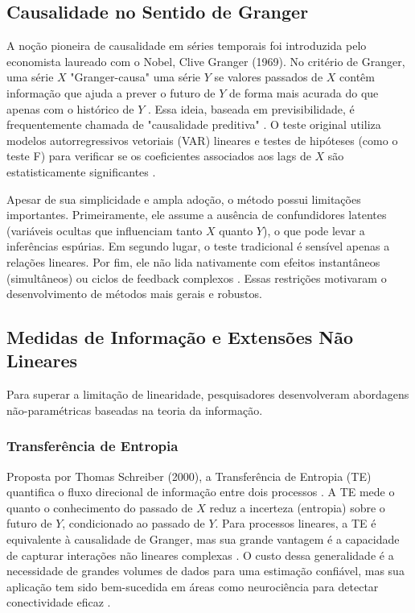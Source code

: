 \documentclass[12pt, a4paper]{article}
\begin{document}
\subsection{Causalidade no Sentido de Granger}

A noção pioneira de causalidade em séries temporais foi introduzida pelo economista laureado com o Nobel, Clive Granger (1969). No critério de Granger, uma série $X$ "Granger-causa" uma série $Y$ se valores passados de $X$ contêm informação que ajuda a prever o futuro de $Y$ de forma mais acurada do que apenas com o histórico de $Y$ \cite{granger1969}. Essa ideia, baseada em previsibilidade, é frequentemente chamada de "causalidade preditiva" \cite{wiki:granger}. O teste original utiliza modelos autorregressivos vetoriais (VAR) lineares e testes de hipóteses (como o teste F) para verificar se os coeficientes associados aos lags de $X$ são estatisticamente significantes \cite{granger1969}.

Apesar de sua simplicidade e ampla adoção, o método possui limitações importantes. Primeiramente, ele assume a ausência de confundidores latentes (variáveis ocultas que influenciam tanto $X$ quanto $Y$), o que pode levar a inferências espúrias. Em segundo lugar, o teste tradicional é sensível apenas a relações lineares. Por fim, ele não lida nativamente com efeitos instantâneos (simultâneos) ou ciclos de feedback complexos \cite{wiki:granger}. Essas restrições motivaram o desenvolvimento de métodos mais gerais e robustos.

\subsection{Medidas de Informação e Extensões Não Lineares}

Para superar a limitação de linearidade, pesquisadores desenvolveram abordagens não-paramétricas baseadas na teoria da informação.

\subsubsection{Transferência de Entropia}
Proposta por Thomas Schreiber (2000), a Transferência de Entropia (TE) quantifica o fluxo direcional de informação entre dois processos \cite{schreiber2000}. A TE mede o quanto o conhecimento do passado de $X$ reduz a incerteza (entropia) sobre o futuro de $Y$, condicionado ao passado de $Y$. Para processos lineares, a TE é equivalente à causalidade de Granger, mas sua grande vantagem é a capacidade de capturar interações não lineares complexas \cite{schreiber2000, wiki:transferentropy}. O custo dessa generalidade é a necessidade de grandes volumes de dados para uma estimação confiável, mas sua aplicação tem sido bem-sucedida em áreas como neurociência para detectar conectividade eficaz \cite{wiki:transferentropy}.
\end{document}

